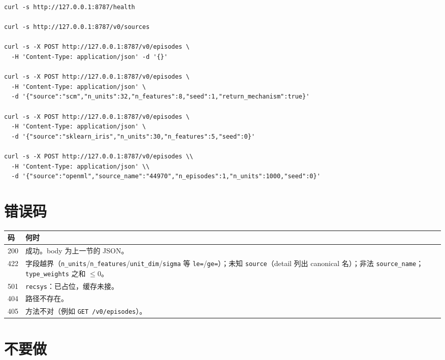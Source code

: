 \documentclass[11pt,a4paper,fontset=none]{ctexart}
\begin{document}
\begin{lstlisting}
curl -s http://127.0.0.1:8787/health

curl -s http://127.0.0.1:8787/v0/sources

curl -s -X POST http://127.0.0.1:8787/v0/episodes \
  -H 'Content-Type: application/json' -d '{}'

curl -s -X POST http://127.0.0.1:8787/v0/episodes \
  -H 'Content-Type: application/json' \
  -d '{"source":"scm","n_units":32,"n_features":8,"seed":1,"return_mechanism":true}'

curl -s -X POST http://127.0.0.1:8787/v0/episodes \
  -H 'Content-Type: application/json' \
  -d '{"source":"sklearn_iris","n_units":30,"n_features":5,"seed":0}'

curl -s -X POST http://127.0.0.1:8787/v0/episodes \\
  -H 'Content-Type: application/json' \\
  -d '{"source":"openml","source_name":"44970","n_episodes":1,"n_units":1000,"seed":0}'
\end{lstlisting}

\section{错误码}

\begin{center}
\begin{tabular}{@{}lp{11.2cm}@{}}
\toprule
码 & 何时 \\
\midrule
200 & 成功。body 为上一节的 JSON。 \\
422 & 字段越界（\texttt{n\_units}/\texttt{n\_features}/\texttt{unit\_dim}/\texttt{sigma} 等 \texttt{le=}/\texttt{ge=}）；未知 \texttt{source}（detail 列出 canonical 名）；非法 \texttt{source\_name}；\texttt{type\_weights} 之和 $\le 0$。 \\
501 & \texttt{recsys}：已占位，缓存未接。 \\
404 & 路径不存在。 \\
405 & 方法不对（例如 \texttt{GET /v0/episodes}）。 \\
\bottomrule
\end{tabular}
\end{center}

\section{不要做}
\end{document}
